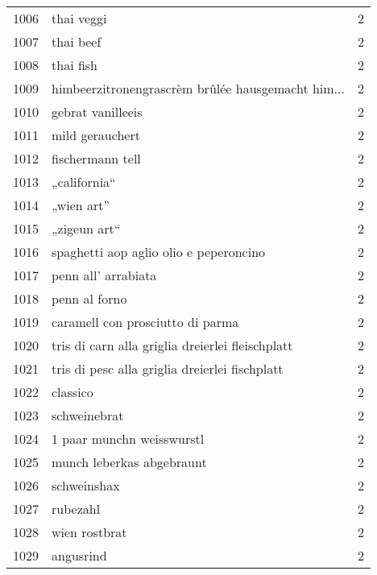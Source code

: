 \begin{tabular}{llr}
1006 &                                         thai veggi &      2 \\
1007 &                                          thai beef &      2 \\
1008 &                                          thai fish &      2 \\
1009 &  himbeerzitronengrascrèm brûlée hausgemacht him... &      2 \\
1010 &                                  gebrat vanilleeis &      2 \\
1011 &                                    mild gerauchert &      2 \\
1012 &                                   fischermann tell &      2 \\
1013 &                                       „california“ &      2 \\
1014 &                                         „wien art” &      2 \\
1015 &                                       „zigeun art“ &      2 \\
1016 &             spaghetti aop aglio olio e peperoncino &      2 \\
1017 &                                penn all’ arrabiata &      2 \\
1018 &                                      penn al forno &      2 \\
1019 &                   caramell con prosciutto di parma &      2 \\
1020 &   tris di carn alla griglia dreierlei fleischplatt &      2 \\
1021 &     tris di pesc alla griglia dreierlei fischplatt &      2 \\
1022 &                                           classico &      2 \\
1023 &                                       schweinebrat &      2 \\
1024 &                          1 paar munchn weisswurstl &      2 \\
1025 &                          munch leberkas abgebraunt &      2 \\
1026 &                                        schweinshax &      2 \\
1027 &                                           rubezahl &      2 \\
1028 &                                      wien rostbrat &      2 \\
1029 &                                          angusrind &      2 \\

\end{tabular}
